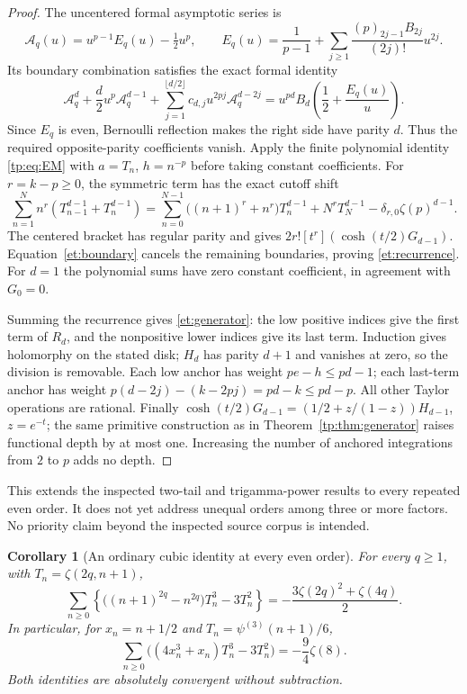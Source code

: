 \documentclass[11pt,a4paper]{article}
\numberwithin{equation}{section}
\newtheorem{corollary}[theorem]{Corollary}
\theoremstyle{definition}
\theoremstyle{remark}
\begin{document}
\begin{proof}
The uncentered formal asymptotic series is
\[
 \mathcal A_q(u)=u^{p-1}E_q(u)-\tfrac12u^p,
 \qquad E_q(u)=\frac1{p-1}
    +\sum_{j\geq1}\frac{(p)_{2j-1}B_{2j}}{(2j)!}u^{2j}.
\]
Its boundary combination satisfies the exact formal identity
\begin{equation}\label{et:boundary}
 \mathcal A_q^d+\frac d2u^p\mathcal A_q^{d-1}
 +\sum_{j=1}^{\lfloor d/2\rfloor}c_{d,j}u^{2pj}\mathcal A_q^{d-2j}
 =u^{pd}B_d\left(\frac12+\frac{E_q(u)}u\right).
\end{equation}
Since $E_q$ is even, Bernoulli reflection makes the right side have
parity $d$. Thus the required opposite-parity coefficients vanish.
Apply the finite polynomial identity \eqref{tp:eq:EM} with
$a=T_n$, $h=n^{-p}$ before taking constant coefficients. For
$r=k-p\geq0$, the symmetric term has the exact cutoff shift
\[
 \sum_{n=1}^N n^r(T_{n-1}^{d-1}+T_n^{d-1})
 =\sum_{n=0}^{N-1}\bigl((n+1)^r+n^r\bigr)T_n^{d-1}
   +N^rT_N^{d-1}-\delta_{r,0}\zeta(p)^{d-1}.
\]
The centered bracket has regular parity and gives
$2r![t^r](\cosh(t/2)G_{d-1})$. Equation~\eqref{et:boundary}
cancels the remaining boundaries, proving \eqref{et:recurrence}.
For $d=1$ the polynomial sums have zero constant coefficient, in
agreement with $G_0=0$.

Summing the recurrence gives \eqref{et:generator}: the low positive
indices give the first term of $R_d$, and the nonpositive lower
indices give its last term. Induction gives holomorphy on the stated
disk; $H_d$ has parity $d+1$ and vanishes at zero, so the division is
removable. Each low anchor has weight $pe-h\leq pd-1$; each last-term
anchor has weight $p(d-2j)-(k-2pj)=pd-k\leq pd-p$.
All other Taylor operations are rational. Finally
$\cosh(t/2)G_{d-1}=(1/2+z/(1-z))H_{d-1}$, $z=e^{-t}$;
the same primitive construction as in Theorem~\ref{tp:thm:generator}
raises functional depth by at most one. Increasing the number of
anchored integrations from $2$ to $p$ adds no depth.
\end{proof}

This extends the inspected two-tail and trigamma-power results to every
repeated even order. It does not yet address unequal orders among
three or more factors. No priority claim beyond the inspected source
corpus is intended.

\begin{corollary}[An ordinary cubic identity at every even order]
\label{et:cubic}
For every $q\geq1$, with $T_n=\zeta(2q,n+1)$,
\begin{equation}\label{et:cubic-formula}
 \boxed{\sum_{n\geq0}\left\{
       \bigl((n+1)^{2q}-n^{2q}\bigr)T_n^3-3T_n^2\right\}
       =-\frac{3\zeta(2q)^2+\zeta(4q)}2.}
\end{equation}
In particular, for $x_n=n+1/2$ and $T_n=\psi^{(3)}(n+1)/6$,
\begin{equation}\label{et:psi3}
 \boxed{\sum_{n\geq0}
       \bigl((4x_n^3+x_n)T_n^3-3T_n^2\bigr)
                      =-\frac94\zeta(8).}
\end{equation}
Both identities are absolutely convergent without subtraction.
\end{corollary}
\end{document}
